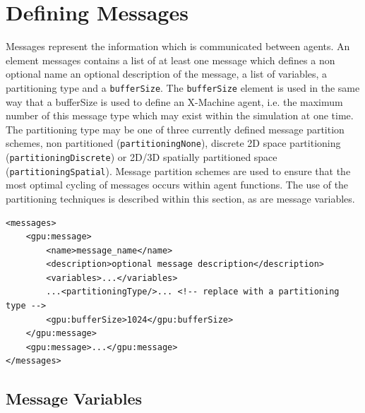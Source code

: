 \documentclass[11pt, a4paper, onecolumn, oneside]{report}
\begin{document}
\section{Defining Messages}
\label{sec:24}


Messages represent the information which is communicated between agents.
An element messages contains a list of at least one message which defines a non optional name an optional description of the message, a list of variables, a partitioning type and a \texttt{bufferSize}.
The \texttt{bufferSize} element is used in the same way that a bufferSize is used to define an X-Machine agent, i.e. the maximum number of this message type which may exist within the simulation at one time.
The partitioning type may be one of three currently defined message partition schemes, non partitioned (\texttt{partitioningNone}), discrete 2D space partitioning (\texttt{partitioningDiscrete}) or 2D/3D spatially partitioned space (\texttt{partitioningSpatial}).
Message partition schemes are used to ensure that the most optimal cycling of messages occurs within agent functions. The use of the partitioning techniques is described within this section, as are message variables.

\begin{verbatim}
<messages>
    <gpu:message>
        <name>message_name</name>
        <description>optional message description</description>
        <variables>...</variables>
        ...<partitioningType/>... <!-- replace with a partitioning type -->
        <gpu:bufferSize>1024</gpu:bufferSize>
    </gpu:message>
    <gpu:message>...</gpu:message>
</messages>
\end{verbatim}

\subsection{Message Variables}
\label{sec:241}
\end{document}
